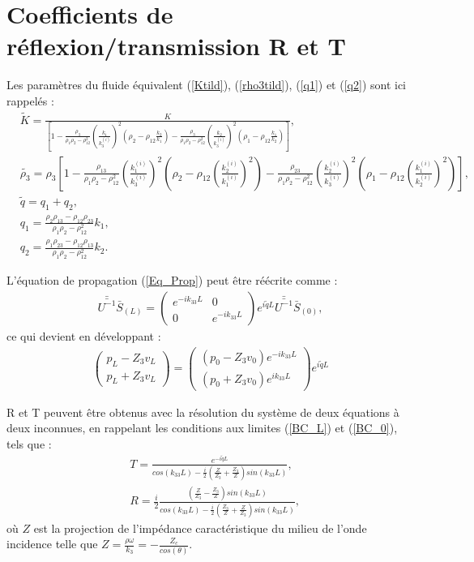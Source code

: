 \documentclass[12pt]{report}
\begin{document}
\section{Coefficients de réflexion/transmission R et T}
\label{Ch_Dir_S_R/T}
    Les paramètres du fluide équivalent (\ref{Ktild}), (\ref{rho3tild}), (\ref{q1}) et (\ref{q2}) sont ici rappelés :
    \begin{align*}
    &\tilde{K}=\frac{K}{[1-\frac{\rho_3}{\rho_1\rho_2-\rho_{12}^2}(\frac{k_1}{k_3^{(i)}})^2(\rho_2-\rho_{12}\frac{k_2}{k_1})-\frac{\rho_3}{\rho_1\rho_2-\rho_{12}^2}(\frac{k_2}{k_3^{(i)}})^2(\rho_1-\rho_{12}\frac{k_1}{k_2})]},\\
    &\tilde{\rho_3}=\rho_3[1-\frac{\rho_{13}}{\rho_1\rho_2-\rho_{12}^2}(\frac{k_1^{(i)}}{k_3^{(i)}})^2(\rho_2-\rho_{12}(\frac{k_2^{(i)}}{k_1^{(i)}})^2)-\frac{\rho_{23}}{\rho_{1}\rho_2-\rho_{12}^2}(\frac{k_2^{(i)}}{k_3^{(i)}})^2(\rho_1-\rho_{12}(\frac{k_1^{(i)}}{k_2^{(i)}})^2)], \\
    &\tilde{q}=q_1+q_2,\\
    &q_{1}=\frac{\rho_2\rho_{13}-\rho_{12}\rho_{23}}{\rho_1\rho_2-\rho_{12}^2}k_1,\\
    &q_{2}= \frac{\rho_1\rho_{23}-\rho_{12}\rho_{13}}{\rho_1\rho_2-\rho_{12}^2}k_2.
    \end{align*}
    
    L'équation de propagation (\ref{Eq_Prop}) peut être réécrite comme :
    \begin{align}
         \bar{\bar{U^{-1}}}\bar{S}_{(L)}=\begin{pmatrix}
                        e^{-ik_{33}L} & 0 \\ 0 & e^{-ik_{33}L} 
                      \end{pmatrix} e^{i\tilde{q}L}\bar{\bar{U^{-1}}}\bar{S}_{(0)},
    \end{align}
    ce qui devient en développant :
    \begin{align}
    \begin{pmatrix}
		p_L-Z_3v_L \\ p_L+Z_3v_L
    \end{pmatrix}=\begin{pmatrix}
              		(p_0-Z_3v_0)e^{-i k_{33} L} \\ (p_0+Z_3v_0)e^{i k_{33} L}
            \end{pmatrix} e^{i \tilde{q} L}\label{eqDif_tmp}
    \end{align}  
    
    R et T peuvent être obtenus avec la résolution du système de deux équations à deux inconnues, en rappelant les conditions aux limites (\ref{BC_L}) et (\ref{BC_0}), tels que :
    \begin{align}
    &T=\frac{e^{-i\tilde{q}L}}{cos(k_{33}L)-\frac{i}{2}(\frac{Z}{Z_3}+\frac{Z_3}{Z})sin(k_{33}L)}\label{Transmission},\\ 
    &R=\frac{i}{2} \frac{(\frac{Z}{Z_3}-\frac{Z_3}{Z})sin(k_{33}L)}{cos(k_{33}L)-\frac{i}{2}(\frac{Z_3}{Z}+\frac{Z}{Z_3})sin(k_{33}L)}\label{Reflexion},
    \end{align}
    où $Z$ est la projection de l'impédance caractéristique du milieu de l'onde incidence telle que $Z=\frac{\rho\omega}{k_3}=-\frac{Z_c}{cos(\theta)}$.
    
\end{document}
